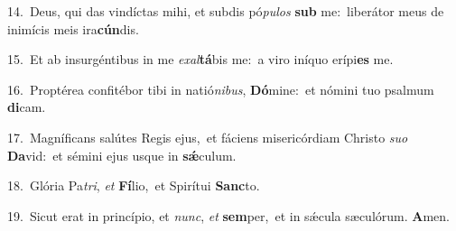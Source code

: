 {\numbfont\textcolor{\numbcolor}{14.}}~Deus, qui das vindíctas mihi, et subdis pó\-\textit{pu}\-\textit{los} \textbf{sub} me:~\star liberátor meus de inimícis meis ira\-\textbf{cún}\-dis.\par
{\numbfont\textcolor{\numbcolor}{15.}}~Et ab insurgéntibus in me \textit{ex}\-\textit{al}\textbf{tá}bis me:~\star a viro iníquo erípi\textbf{es} me.\par
{\numbfont\textcolor{\numbcolor}{16.}}~Proptérea confitébor tibi in natió\-\textit{ni}\-\textit{bus}, \textbf{Dó}\-mine:~\star et nómini tuo psalmum \textbf{di}\-cam.\par
{\numbfont\textcolor{\numbcolor}{17.}}~Magníficans salútes Regis ejus,~\dagger et fáciens misericórdiam Christo \textit{su}\-\textit{o} \textbf{Da}\-vid:~\star et sémini ejus usque in \textbf{sǽ}\-culum.\par
{\numbfont\textcolor{\numbcolor}{18.}}~Glória Pa\-\textit{tri}\-, \textit{et} \textbf{Fí}\-lio,~\star et Spirítui \textbf{Sanc}\-to.\par
{\numbfont\textcolor{\numbcolor}{19.}}~Sicut erat in princípio, et \textit{nunc}\-, \textit{et} \textbf{sem}\-per,~\star et in sǽcula sæculórum. \textbf{A}\-men.\par
